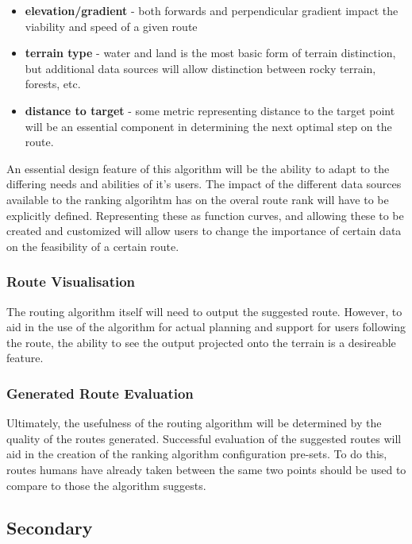 \begin{itemize}
\tightlist
\item
  \textbf{elevation/gradient} - both forwards and perpendicular gradient
  impact the viability and speed of a given route
\item
  \textbf{terrain type} - water and land is the most basic form of
  terrain distinction, but additional data sources will allow
  distinction between rocky terrain, forests, etc.
\item
  \textbf{distance to target} - some metric representing distance to the
  target point will be an essential component in determining the next
  optimal step on the route.
\end{itemize}

An essential design feature of this algorithm will be the ability to
adapt to the differing needs and abilities of it's users. The impact of
the different data sources available to the ranking algorihtm has on the
overal route rank will have to be explicitly defined. Representing these
as function curves, and allowing these to be created and customized will
allow users to change the importance of certain data on the feasibility
of a certain route.

\hypertarget{route-visualisation}{%
\subsubsection{Route Visualisation}\label{route-visualisation}}

The routing algorithm itself will need to output the suggested route.
However, to aid in the use of the algorithm for actual planning and
support for users following the route, the ability to see the output
projected onto the terrain is a desireable feature.

\hypertarget{generated-route-evaluation}{%
\subsubsection{Generated Route
Evaluation}\label{generated-route-evaluation}}

Ultimately, the usefulness of the routing algorithm will be determined
by the quality of the routes generated. Successful evaluation of the
suggested routes will aid in the creation of the ranking algorithm
configuration pre-sets. To do this, routes humans have already taken
between the same two points should be used to compare to those the
algorithm suggests.

\hypertarget{secondary}{%
\subsection{Secondary}\label{secondary}}

